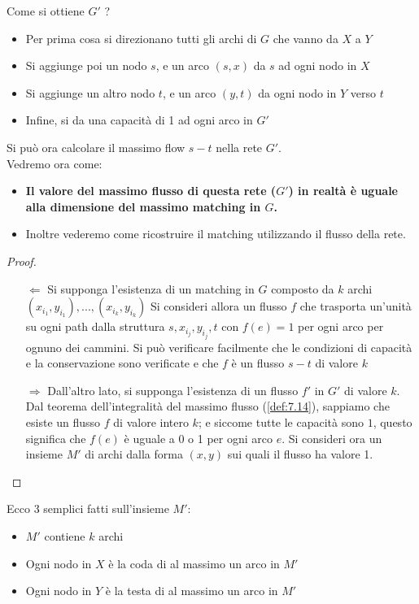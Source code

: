 Come si ottiene $G'$ ?
\begin{itemize}
	\item Per prima cosa si direzionano tutti gli archi di $G$ che vanno da $X$ a $Y$
	\item Si aggiunge poi un nodo $s$, e un arco $(s, x)$ da $s$ ad ogni nodo in $X$
	\item Si aggiunge un altro nodo $t$, e un arco $(y, t)$ da ogni nodo in $Y$ verso $t$
	\item Infine, si da una capacità di 1 ad ogni arco in $G'$
\end{itemize}

Si può ora calcolare il massimo flow $s-t$ nella rete $G'$.\\

Vedremo ora come:
\begin{itemize}
	\item \textbf{Il valore del massimo flusso di questa rete ($G'$) in
		      realtà è uguale alla dimensione del massimo matching in $G$.}
	\item Inoltre vederemo come ricostruire il matching utilizzando il flusso della rete.
\end{itemize}

\begin{proof}\
	\begin{itemize}
		\item[$\Leftarrow$] Si supponga l'esistenza di un matching in $G$
			composto da $k$ archi \linebreak $(x_{i_1}, y_{i_1}), ..., (x_{i_k}, y_{i_k})$
			Si consideri allora un flusso $f$ che trasporta un'unità su ogni
			path dalla struttura $s, x_{i_j}, y_{i_j}, t$ con $f(e) = 1$ per
			ogni arco per ognuno dei cammini. Si può verificare facilmente che
			le condizioni di capacità e la conservazione sono verificate e che
			$f$ è un flusso $s-t$ di valore $k$
		\item [$\Rightarrow$] Dall'altro lato, si supponga l'esistenza di un
		      flusso $f'$ in $G'$ di valore $k$. Dal teorema dell'integralità
		      del massimo flusso (\ref{def:7.14}), sappiamo che
		      esiste un flusso $f$ di valore intero $k$; e siccome tutte le
		      capacità sono $1$, questo significa che $f(e)$ è uguale a 0 o 1
		      per ogni arco $e$. Si consideri ora un insieme $M'$ di archi dalla
		      forma $(x, y)$ sui quali il flusso ha valore 1.
	\end{itemize}
\end{proof}

Ecco 3 semplici fatti sull'insieme $M'$:
\begin{itemize}
	\item $M'$ contiene $k$ archi
	\item Ogni nodo in $X$ è la coda di al massimo un arco in $M'$
	\item Ogni nodo in $Y$ è la testa di al massimo un arco in $M'$
\end{itemize}

